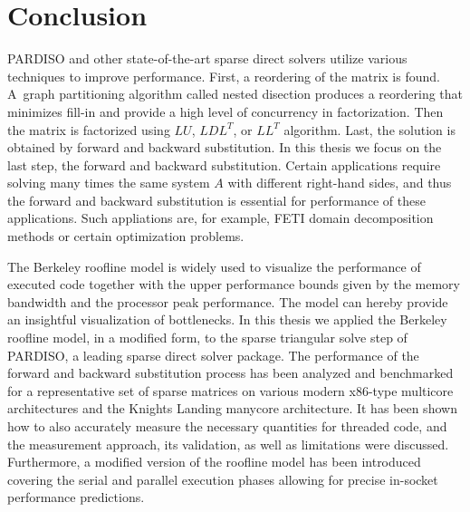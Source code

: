 \chapter{Conclusion}
\label{sec:conclusion}

PARDISO and other state-of-the-art sparse direct solvers utilize various techniques to improve performance. First, a reordering of the matrix is found. A~graph partitioning algorithm called nested disection produces a reordering that minimizes fill-in and provide a high level of concurrency in factorization. Then the matrix is factorized using $LU$, $LDL^T$, or $LL^T$ algorithm. Last, the solution is obtained by forward and backward substitution. In this thesis we focus on the last step, the forward and backward substitution. Certain applications require solving many times the same system $A$ with different right-hand sides, and thus the forward and backward substitution is essential for performance of these applications. Such appliations are, for example, FETI domain decomposition methods or certain optimization problems.

The Berkeley roofline model is widely used to visualize the performance of executed code together with the upper performance bounds given by the memory bandwidth and the processor peak performance. The model can hereby provide an insightful visualization of bottlenecks. In this thesis we applied the Berkeley roofline model, in a modified form, to the sparse triangular solve step of PARDISO, a leading sparse direct solver package. The performance of the forward and backward substitution process has been analyzed and benchmarked for a representative set of sparse matrices on various modern x86-type multicore architectures and the Knights Landing manycore architecture. It has been shown how to also accurately measure the necessary quantities for threaded code, and the measurement approach, its validation, as well as limitations were discussed. Furthermore, a modified version of the roofline model has been introduced covering the serial and parallel execution phases allowing for precise in-socket performance predictions.

